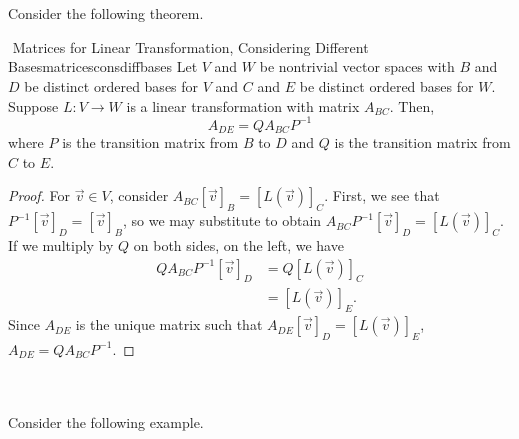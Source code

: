         \\
        \\
        Consider the following theorem.
        \begin{theorem}{\Stop\,\,Matrices for Linear Transformation, Considering Different Bases}{matricesconsdiffbases}
            Let \(V\) and \(W\) be nontrivial vector spaces with \(B\) and \(D\) be distinct ordered bases for \(V\) and \(C\) and \(E\) be distinct ordered bases for \(W\). Suppose \(L:V\to W\) is a linear transformation with matrix \(A_{BC}\). Then,
            \begin{equation*}
                A_{DE}=QA_{BC}P^{-1}
            \end{equation*}
            where \(P\) is the transition matrix from \(B\) to \(D\) and \(Q\) is the transition matrix from \(C\) to \(E\).
            \begin{proof}
                For \(\vec{v}\in V\), consider \(A_{BC}[\vec{v}]_B=[L(\vec{v})]_C\). First, we see that \(P^{-1}[\vec{v}]_D=[\vec{v}]_B\), so we may substitute to obtain \(A_{BC}P^{-1}[\vec{v}]_D=[L(\vec{v})]_C\). If we multiply by \(Q\) on both sides, on the left, we have
                \begin{align*}
                    QA_{BC}P^{-1}[\vec{v}]_D&=Q[L(\vec{v})]_C \\
                    &=[L(\vec{v})]_E.
                \end{align*}
                Since \(A_{DE}\) is the unique matrix such that \(A_{DE}[\vec{v}]_D=[L(\vec{v})]_E\), \(A_{DE}=QA_{BC}P^{-1}\).
            \end{proof}
        \end{theorem}
        \pagebreak
        \vphantom
        \\
        \\
        Consider the following example.
